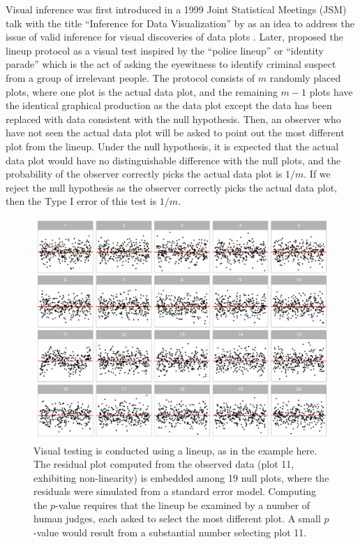 \documentclass[]{interact}
\theoremstyle{plain}%
\theoremstyle{definition}
\theoremstyle{remark}
\begin{document}
Visual inference was first introduced in a 1999 Joint Statistical
Meetings (JSM) talk with the title ``Inference for Data Visualization''
by \citet{buja_inference_1999} as an idea to address the issue of valid
inference for visual discoveries of data plots
\citep{gelman_exploratory_2004}. Later, \citet{buja_statistical_2009}
proposed the lineup protocol as a visual test inspired by the ``police
lineup'' or ``identity parade'' which is the act of asking the
eyewitness to identify criminal suspect from a group of irrelevant
people. The protocol consists of \(m\) randomly placed plots, where one
plot is the actual data plot, and the remaining \(m - 1\) plots have the
identical graphical production as the data plot except the data has been
replaced with data consistent with the null hypothesis. Then, an
observer who have not seen the actual data plot will be asked to point
out the most different plot from the lineup. Under the null hypothesis,
it is expected that the actual data plot would have no distinguishable
difference with the null plots, and the probability of the observer
correctly picks the actual data plot is \(1/m\). If we reject the null
hypothesis as the observer correctly picks the actual data plot, then
the Type I error of this test is \(1/m\).

\begin{figure}
\includegraphics[width=1\linewidth]{paper_comparison_files/figure-latex/first-example-lineup-1} \caption{Visual testing is conducted using a lineup, as in the example here. The residual plot computed from the observed data (plot 11, exhibiting non-linearity) is embedded among 19 null plots, where the residuals were simulated from a standard error model. Computing the $p$-value requires that the lineup be examined by a number of human judges, each asked to select the most different plot. A small $p$-value would result from a substantial number selecting plot 11.}\label{fig:first-example-lineup}
\end{figure}
\end{document}
